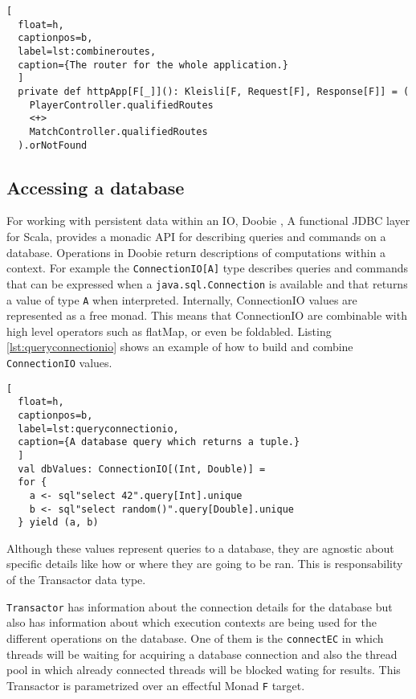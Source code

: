 \documentclass[../main.tex]{subfiles}
\begin{document}
\begin{lstlisting}[
  float=h,
  captionpos=b,
  label=lst:combineroutes,
  caption={The router for the whole application.}
  ]
  private def httpApp[F[_]](): Kleisli[F, Request[F], Response[F]] = (
    PlayerController.qualifiedRoutes
    <+>
    MatchController.qualifiedRoutes
  ).orNotFound
\end{lstlisting}

\subsection{Accessing a database}
For working with persistent data within an IO, Doobie \autocite{Norris2020Doobie}, A functional JDBC layer for Scala,
provides a monadic API for describing
queries and commands on a database. Operations in Doobie return descriptions of
computations within a context. For example the \texttt{ConnectionIO[A]} type
describes queries and commands that can be expressed when a
\texttt{java.sql.Connection} is available and that returns a value of type
\texttt{A} when interpreted. Internally, ConnectionIO values are represented as a
free monad. This means that ConnectionIO are combinable with high level
operators such as flatMap, or even be foldabled. Listing \ref{lst:queryconnectionio} shows an
example of how to build and combine \texttt{ConnectionIO} values.

\begin{lstlisting}[
  float=h,
  captionpos=b,
  label=lst:queryconnectionio,
  caption={A database query which returns a tuple.}
  ]
  val dbValues: ConnectionIO[(Int, Double)] =
  for {
    a <- sql"select 42".query[Int].unique
    b <- sql"select random()".query[Double].unique
  } yield (a, b)
\end{lstlisting}

Although these values represent queries to a database, they are agnostic about
specific details like how or where they are going to be ran. This is
responsability of the Transactor data type.

\texttt{Transactor} has information about the connection details for the
database but also has information about which execution contexts are being used
for the different operations on the database. One of them is the
\texttt{connectEC} in which threads will be waiting for acquiring a database
connection and also the thread pool in which already connected threads will be
blocked wating for results. This Transactor is parametrized over an effectful
Monad \texttt{F} target.
\end{document}
